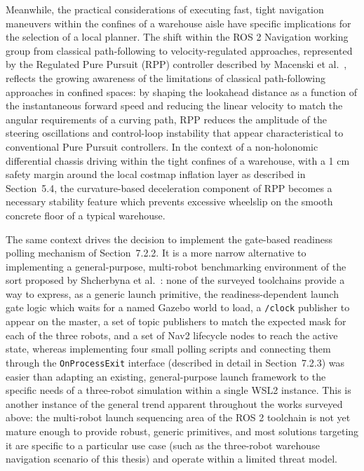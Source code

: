 Meanwhile, the practical considerations of executing fast, tight navigation maneuvers within the confines of a warehouse aisle have specific implications for the selection of a local planner. The shift within the ROS 2 Navigation working group from classical path-following to velocity-regulated approaches, represented by the Regulated Pure Pursuit (RPP) controller described by Macenski et al.\ \cite{macenski2023regulated}, reflects the growing awareness of the limitations of classical path-following approaches in confined spaces: by shaping the lookahead distance as a function of the instantaneous forward speed and reducing the linear velocity to match the angular requirements of a curving path, RPP reduces the amplitude of the steering oscillations and control-loop instability that appear characteristical to conventional Pure Pursuit controllers. In the context of a non-holonomic differential chassis driving within the tight confines of a warehouse, with a 1 cm safety margin around the local costmap inflation layer as described in Section~5.4, the curvature-based deceleration component of RPP becomes a necessary stability feature which prevents excessive wheelslip on the smooth concrete floor of a typical warehouse.

The same context drives the decision to implement the gate-based readiness polling mechanism of Section~7.2.2. It is a more narrow alternative to implementing a general-purpose, multi-robot benchmarking environment of the sort proposed by Shcherbyna et al.\ \cite{shcherbyna2024arena}: none of the surveyed toolchains provide a way to express, as a generic launch primitive, the readiness-dependent launch gate logic which waits for a named Gazebo world to load, a \texttt{/clock} publisher to appear on the master, a set of topic publishers to match the expected mask for each of the three robots, and a set of Nav2 lifecycle nodes to reach the active state, whereas implementing four small polling scripts and connecting them through the \texttt{OnProcessExit} interface (described in detail in Section~7.2.3) was easier than adapting an existing, general-purpose launch framework to the specific needs of a three-robot simulation within a single WSL2 instance. This is another instance of the general trend apparent throughout the works surveyed above: the multi-robot launch sequencing area of the ROS 2 toolchain is not yet mature enough to provide robust, generic primitives, and most solutions targeting it are specific to a particular use case (such as the three-robot warehouse navigation scenario of this thesis) and operate within a limited threat model.

